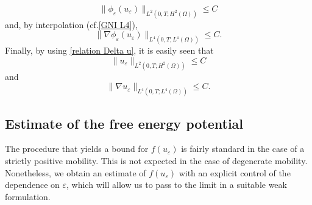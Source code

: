\documentclass[11pt,  reqno]{amsart}%
\theoremstyle{plain}
\theoremstyle{definition}
\theoremstyle{remark}
\numberwithin{equation}{section}
\newcommand{\ve}{\varepsilon}
\begin{document}
\begin{equation}
    \label{NEW-phiH2}
    \|\phi_\ve(u_\ve)\|_{L^2(0,T;H^2(\Omega))} \le C
\end{equation}
and, by interpolation (cf.\eqref{GNI L4}),
\begin{equation}
    \label{NEW-phiW14}
    \| \nabla \phi_\ve(u_\ve)\|_{L^4(0,T;L^4(\Omega))} \le C.
\end{equation}
Finally, by using \eqref{relation Delta u}, it is easily seen that
\begin{equation}
    \label{NEW-uH2}
    \|u_\ve\|_{L^2(0,T;H^2(\Omega))} \le C
\end{equation}
and 
\begin{equation}
    \label{NEW-uW14}
    \| \nabla u_\ve\|_{L^4(0,T;L^4(\Omega))} \le C.
\end{equation}

\subsection{Estimate of the free energy potential}
\label{ss3}
The procedure that yields a bound for $f(u_\ve)$ is fairly standard in the case of a strictly positive mobility. This is not expected in the case of degenerate mobility. Nonetheless, we obtain an estimate  of $f(u_\ve)$ with an explicit control of the dependence on $\ve$, which will allow us to pass to the limit in a suitable weak formulation. 
\end{document}
